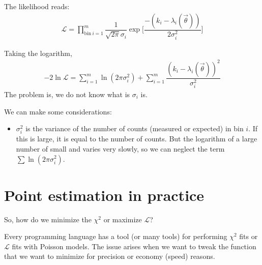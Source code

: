 The likelihood reads: 
\begin{align}
    \mathcal{L} = \prod \limits_{\text{bin} \ i =1}^m \dfrac{1}{\sqrt{2\pi} \sigma_i} \exp\Big[{\dfrac{-(k_i - \lambda_i(\vec{\theta}))}{2 \sigma_i^2}}\Big]
\end{align}

Taking the logarithm, 
\begin{align}
    -2\ln \mathcal{L} = \sum \limits_{i=1}^m \ln(2\pi \sigma_i^2) + \sum \limits_{i=1}^m \dfrac{(k_i - \lambda_i(\vec{\theta}))^2}{\sigma_i^2}
\end{align}
The problem is, we do not know what is $\sigma_i$ is.

We can make some considerations: 
\begin{itemize}[$\to$]
    \item $\sigma_i^2$ is the variance of the number of counts (measured or expected) in bin $i$. If this is large, it is equal to the number of counts. But the logarithm of a large number of small and varies very slowly, so we can neglect the term $\sum \ln{(2\pi\sigma_i^2)}$.
\end{itemize}

\section{Point estimation in practice} \label{sec:point_estimation_in_practice}
So, how do we minimize the $\chi^2$ or maximize $\mathcal{L}$?

Every programming language has a tool (or many tools) for performing $\chi^2$ fits or $\mathcal{L}$ fits with Poisson models. The issue arises when we want to tweak the function that we want to minimize for precision or economy (speed) reasons. 

